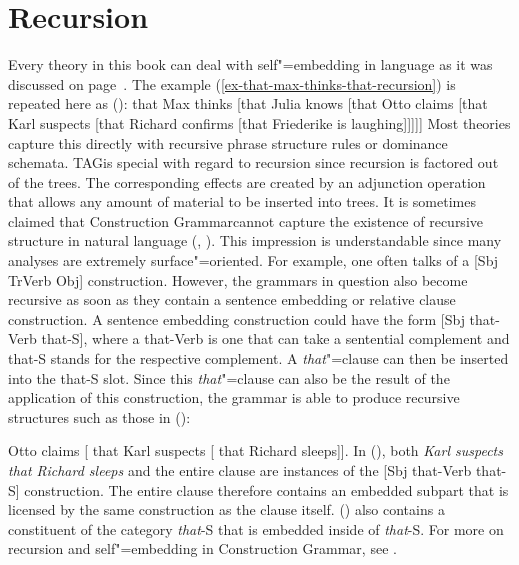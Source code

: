 \section{Recursion}
\label{sec-recursion}

Every theory in this book can deal with self"=embedding in language as it was
discussed on page~\pageref{ex-that-max-thinks-that-recursion}. The example
(\ref{ex-that-max-thinks-that-recursion}) is repeated here as ():
\ea
\label{ex-that-max-thinks-that-recursion-two}
that Max thinks [that Julia knows [that Otto claims [that Karl
suspects [that Richard confirms [that Friederike is laughing]]]]]
\z
Most theories
capture this directly with recursive phrase structure rules or dominance schemata. TAG\indextag is
special with regard to recursion since recursion is factored out of the trees. The corresponding
effects are created by an adjunction operation that allows any amount of material to be inserted
into trees.  It is sometimes claimed that Construction Grammar\indexcxg cannot capture the existence
of recursive structure in natural language (\eg, \citealp[]{Leiss2009a}).  This impression
is understandable since many analyses are extremely surface"=oriented. For example, one often talks
of a [Sbj TrVerb Obj] construction. However, the grammars in question also become recursive as soon
as they contain a sentence embedding or relative clause construction. A sentence embedding
construction could have the form [Sbj that-Verb that-S], where a that-Verb is one that can take
a sentential complement and that-S stands for the respective complement. A \emph{that}"=clause can then be inserted
into the that-S slot. Since this \emph{that}"=clause can also be the result of the application of
this construction, the grammar is able to produce recursive structures such as those in ():

\ea
Otto claims [ that Karl suspects [ that Richard sleeps]].
\z
In (), both \emph{Karl suspects that Richard sleeps} and the entire clause are instances of the [Sbj
that-Verb that-S] construction. The entire clause therefore contains an embedded subpart that is licensed by
the same construction as the clause itself. () also contains a constituent of the category
\emph{that}-S that is embedded inside of \emph{that}-S. For more on recursion and self"=embedding in Construction Grammar, see .

